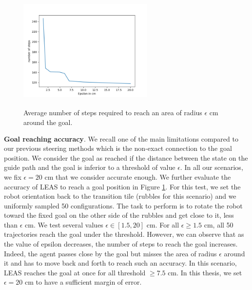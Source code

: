 \begin{figure}
    \centering
    \includegraphics[width=0.6\textwidth, height=6cm]{Figures/Chapter_LEAS/test_epsilon.png}
    \caption{Average number of steps required to reach an area of radius $\epsilon$ cm around the goal.}
    \label{fig:nb_steps_required}
\end{figure}

\hfill

\noindent\textbf{Goal reaching accuracy}.
We recall one of the main limitations compared to our previous steering methods which is the non-exact connection to the goal position. We consider the goal as reached if the distance between the state on the guide path and the goal is inferior to a threshold of value $\epsilon$. In all our scenarios, we fix $\epsilon = 20$ cm that we consider accurate enough.
We further evaluate the accuracy of LEAS to reach a goal position in Figure \ref{fig:nb_steps_required}. For this test, we set the robot orientation back to the transition tile (rubbles for this scenario) and we uniformly sampled 50 configurations. The task to perform is to rotate the robot toward the fixed goal on the other side of the rubbles and get close to it, less than $\epsilon$ cm.
We test several values $\epsilon \in [1.5, 20]$ cm. 
For all $\epsilon \geq 1.5$ cm, all 50 trajectories reach the goal under the threshold. However, we can observe that as the value of epsilon decreases, the number of steps to reach the goal increases. Indeed, the agent passes close by the goal but misses the area of radius $\epsilon$ around it and has to move back and forth to reach such an accuracy. 
In this scenario, LEAS reaches the goal at once for all threshold $\geq 7.5 $ cm. In this thesis, we set $\epsilon=20$ cm to have a sufficient margin of error.

